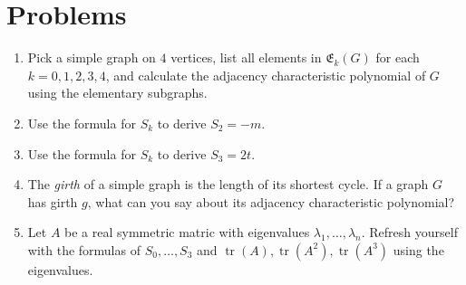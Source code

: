 \documentclass{article}
\newcommand{\tr}{\operatorname{tr}}
\theoremstyle{definition}
\begin{document}
\section*{Problems}
\begin{enumerate}
\setlength\itemsep{2em}
\item Pick a simple graph on $4$ vertices, list all elements in $\mathfrak{E}_k(G)$ for each $k = 0,1,2,3,4$, and calculate the adjacency characteristic polynomial of $G$ using the elementary subgraphs.
\item Use the formula for $S_k$ to derive $S_2 = -m$.  
\item Use the formula for $S_k$ to derive $S_3 = 2t$.  
\item The \emph{girth} of a simple graph is the length of its shortest cycle.  If a graph $G$ has girth $g$, what can you say about its adjacency characteristic polynomial?
\item Let $A$ be a real symmetric matric with eigenvalues $\lambda_1,\ldots, \lambda_n$.  Refresh yourself with the formulas of $S_0,\ldots, S_3$ and $\tr(A),\tr(A^2),\tr(A^3)$ using the eigenvalues.
\end{enumerate}

\end{document}
